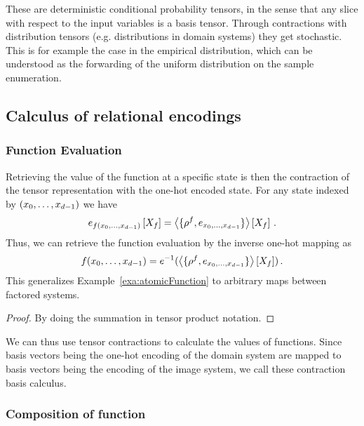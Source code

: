 These are deterministic conditional probability tensors, in the sense that any slice with respect to the input variables is a basis tensor.
Through contractions with distribution tensors (e.g. distributions in domain systems) they get stochastic.
This is for example the case in the empirical distribution, which can be understood as the forwarding of the uniform distribution on the sample enumeration.








\subsection{Calculus of relational encodings}



\subsubsection{Function Evaluation}

\begin{theorem}\label{the:basisCalculus}
	Retrieving the value of the function at a specific state is then the contraction of the tensor representation with the one-hot encoded state.
	For any state indexed by $(x_{0},\ldots,x_{d-1})$ we have
		\[ e_{f(x_{0},\ldots,x_{d-1})}\left[X_{f}\right] 
		= \left\langle \{\rho^{f},e_{x_{0},\ldots,x_{d-1}}\}\right\rangle \left[ X_{f} \right] \, .\]
	Thus, we can retrieve the function evaluation by the inverse one-hot mapping as
		\[ f(x_{0},\ldots,x_{d-1}) 
		= e^{-1}(\left\langle \{\rho^{f},e_{x_{0},\ldots,x_{d-1}}\}\right\rangle \left[ X_{f} \right]) \, . \]
	This generalizes Example~\ref{exa:atomicFunction} to arbitrary maps between factored systems.
\end{theorem}
\begin{proof}
	By doing the summation in tensor product notation.
\end{proof}

We can thus use tensor contractions to calculate the values of functions.
Since basis vectors being the one-hot encoding of the domain system are mapped to basis vectors being the encoding of the image system, we call these contraction basis calculus.

\subsubsection{Composition of function}

